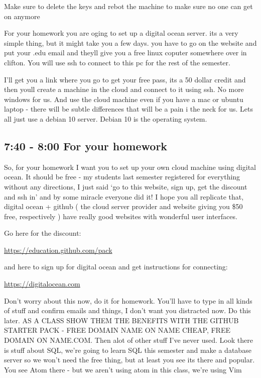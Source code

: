 \documentclass[10pt]{article}
\begin{document}
{\LARGE Make sure to delete the keys and rebot the machine to make sure no one
can get on anymore}

For your homework you are oging to set up a digital ocean server. its a very
simple thing, but it might take you a few days. you have to go on the website
and put your .edu email and theyll give you a free linux coputer somewhere over
in clifton. You will use ssh to connect to this pc for the rest of the semester.

I'll get you a link where you go to get your free pass, its a 50 dollar credit
and then youll create a machine in the cloud and connect to it using ssh. No
more windows for us. And use the cloud machine even if you have a mac or ubuntu
laptop - there will be subtle differences that will be a pain i the neck for us.
Lets all just use a debian 10 server. Debian 10 is the operating system.


\subsection{ 7:40 - 8:00 For your homework}

So, for your homework I want you to set up your own cloud machine using digital
ocean. It should be free - my students last semester registered for everything
without any directions, I just said `go to this website, sign up, get the
discount and ssh in' and by some miracle everyone did it! I hope you all
replicate that, digital ocean + github ( the cloud server provider and website
giving you \$50 free, respectively ) have really good websites  with wonderful
user interfaces.

Go here for the discount:

\url{https://education.github.com/pack}

and here to sign up for digital ocean and get instructions for connecting:

\url{https://digitalocean.com}

{\LARGE Don't worry about this now, do it for homework. You'll have to type in
all kinds of stuff and confirm emails and things, I don't want you distracted
now. Do this later. AS A CLASS SHOW THEM THE BENEFITS WITH THE GITHUB STARTER
PACK - FREE DOMAIN NAME ON NAME CHEAP, FREE DOMAIN ON NAME.COM. Then alot of
other stuff I've never used. Look there is stuff about SQL, we're going to learn
SQL this semester and make a database server so we won't need the free thing,
but at least you see its there and popular. You see Atom there - but we aren't
using atom in this class, we're using Vim}
\end{document}
